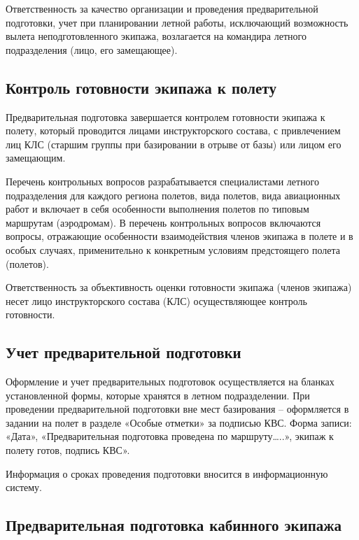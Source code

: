 Ответственность за качество организации и проведения предварительной подготовки, учет при планировании летной работы, исключающий возможность вылета неподготовленного экипажа, возлагается на командира летного подразделения (лицо, его замещающее).

 


\subsection{Контроль готовности экипажа к полету}


Предварительная подготовка завершается контролем готовности экипажа к полету, который проводится лицами инструкторского состава, с привлечением лиц КЛС (старшим группы при базировании в отрыве от базы) или лицом его замещающим.

Перечень контрольных вопросов разрабатывается специалистами летного подразделения для каждого региона полетов, вида полетов, вида авиационных работ и включает в себя особенности выполнения полетов по типовым маршрутам (аэродромам). В перечень контрольных вопросов включаются вопросы, отражающие особенности взаимодействия членов экипажа в полете и в особых случаях, применительно к конкретным условиям предстоящего полета (полетов). 

Ответственность за объективность оценки готовности экипажа (членов экипажа) несет лицо инструкторского состава (КЛС) осуществляющее контроль готовности.

\subsection{Учет предварительной подготовки}


Оформление и учет предварительных подготовок осуществляется на бланках установленной формы, которые хранятся в летном подразделении. При проведении предварительной подготовки вне мест базирования – оформляется в задании на полет в разделе «Особые отметки» за подписью КВС. Форма записи: «Дата», «Предварительная подготовка проведена по маршруту…..», экипаж к полету готов, подпись КВС».

Информация о сроках проведения подготовки вносится в информационную систему.

\subsection{Предварительная подготовка кабинного экипажа}


